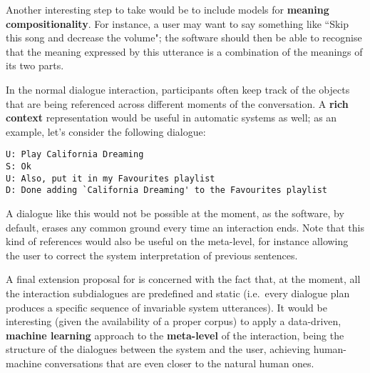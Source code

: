 \label{ch:conclusions:fw:extra:beet}
\vspace{-0.7cm}
\label{ch:conclusions:fw:extra:beetpar}

Another interesting step to take would be to include models for \textbf{meaning compositionality}. For instance, a user may want to say something like ``Skip this song and decrease the volume"; the software should then be able to recognise that the meaning expressed by this utterance is a combination of the meanings of its two parts.

In the normal dialogue interaction, participants often keep track of the objects that are being referenced across different moments of the conversation. A \textbf{rich context} representation would be useful in automatic systems as well; as an example, let's consider the following dialogue:
\begin{verbatim}
U: Play California Dreaming
S: Ok
U: Also, put it in my Favourites playlist
D: Done adding `California Dreaming' to the Favourites playlist
\end{verbatim}
A dialogue like this would not be possible at the moment, as the software, by default, erases any common ground every time an interaction ends. Note that this kind of references would also be useful on the meta-level, for instance allowing the user to correct the system interpretation of previous sentences.


A final extension proposal for \pname is concerned with the fact that, at the moment, all the interaction subdialogues are predefined and static (i.e.\ every dialogue plan produces a specific sequence of invariable system utterances). It would be interesting (given the availability of a proper corpus) to apply a data-driven, \textbf{machine learning} approach to the \textbf{meta-level} of the interaction, being the structure of the dialogues between the system and the user, achieving human-machine conversations that are even closer to the natural human ones.



